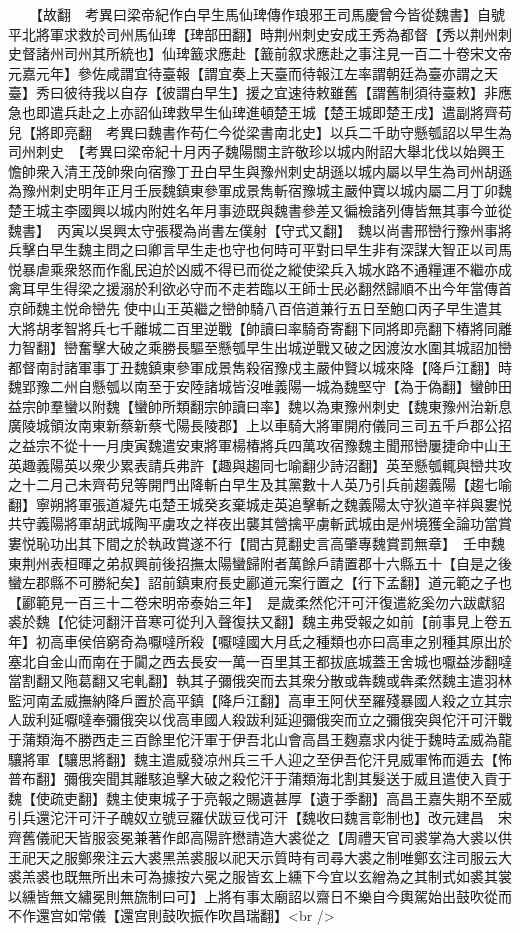 　　【故翻　考異曰梁帝紀作白早生馬仙琕傳作琅邪王司馬慶曾今皆從魏書】自號平北將軍求救於司州馬仙琕【琕部田翻】時荆州刺史安成王秀為都督【秀以荆州刺史督諸州司州其所統也】仙琕籖求應赴【籖前叙求應赴之事注見一百二十卷宋文帝元嘉元年】參佐咸謂宜待臺報【謂宜奏上天臺而待報江左率謂朝廷為臺亦謂之天臺】秀曰彼待我以自存【彼謂白早生】援之宜速待敕雖舊【謂舊制須待臺敕】非應急也即遣兵赴之上亦詔仙琕救早生仙琕進頓楚王城【楚王城即楚王戌】遣副將齊苟兒【將即亮翻　考異曰魏書作苟仁今從梁書南北史】以兵二千助守懸瓠詔以早生為司州刺史　【考異曰梁帝紀十月丙子魏陽關主許敬珍以城内附詔大舉北伐以始興王憺帥衆入清王茂帥衆向宿豫丁丑白早生與豫州刺史胡遜以城内屬以早生為司州胡遜為豫州刺史明年正月壬辰魏鎮東參軍成景雋斬宿豫城主嚴仲寶以城内屬二月丁卯魏楚王城主李國興以城内附姓名年月事迹既與魏書參差又徧檢諸列傳皆無其事今並從魏書】　丙寅以吳興太守張稷為尚書左僕射【守式又翻】　魏以尚書邢巒行豫州事將兵擊白早生魏主問之曰卿言早生走也守也何時可平對曰早生非有深謀大智正以司馬悦暴虐乘衆怒而作亂民迫於凶威不得已而從之縱使梁兵入城水路不通糧運不繼亦成禽耳早生得梁之援溺於利欲必守而不走若臨以王師士民必翻然歸順不出今年當傳首京師魏主悦命巒先使中山王英繼之巒帥騎八百倍道兼行五日至鮑口丙子早生遣其大將胡孝智將兵七千離城二百里逆戰【帥讀曰率騎奇寄翻下同將即亮翻下椿將同離力智翻】巒奮擊大破之乘勝長驅至懸瓠早生出城逆戰又破之因渡汝水圍其城詔加巒都督南討諸軍事丁丑魏鎮東參軍成景雋殺宿豫戍主嚴仲賢以城來降【降戶江翻】時魏郢豫二州自懸瓠以南至于安陸諸城皆沒唯義陽一城為魏堅守【為于偽翻】蠻帥田益宗帥羣蠻以附魏【蠻帥所類翻宗帥讀曰率】魏以為東豫州刺史【魏東豫州治新息廣陵城領汝南東新蔡新蔡弋陽長陵郡】上以車騎大將軍開府儀同三司五千戶郡公招之益宗不從十一月庚寅魏遣安東將軍楊椿將兵四萬攻宿豫魏主聞邢巒屢捷命中山王英趣義陽英以衆少累表請兵弗許【趣與趨同七喻翻少詩沼翻】英至懸瓠輒與巒共攻之十二月己未齊苟兒等開門出降斬白早生及其黨數十人英乃引兵前趨義陽【趨七喻翻】寧朔將軍張道凝先屯楚王城癸亥棄城走英追擊斬之魏義陽太守狄道辛祥與婁悦共守義陽將軍胡武城陶平虜攻之祥夜出襲其營擒平虜斬武城由是州境獲全論功當賞婁悦恥功出其下間之於執政賞遂不行【間古莧翻史言高肇專魏賞罰無章】　壬申魏東荆州表桓暉之弟叔興前後招撫太陽蠻歸附者萬餘戶請置郡十六縣五十【自是之後蠻左郡縣不可勝紀矣】詔前鎮東府長史酈道元案行置之【行下孟翻】道元範之子也【酈範見一百三十二卷宋明帝泰始三年】　是歲柔然佗汗可汗復遣紇奚勿六跋獻貂裘於魏【佗徒河翻汗音寒可從刋入聲復扶又翻】魏主弗受報之如前【前事見上卷五年】初高車侯倍窮奇為嚈噠所殺【嚈噠國大月氐之種類也亦曰高車之别種其原出於塞北自金山而南在于闐之西去長安一萬一百里其王都拔底城蓋王舍城也嚈益涉翻噠當割翻又陁葛翻又宅軋翻】執其子彌俄突而去其衆分散或犇魏或犇柔然魏主遣羽林監河南孟威撫納降戶置於高平鎮【降戶江翻】高車王阿伏至羅殘暴國人殺之立其宗人跋利延嚈噠奉彌俄突以伐高車國人殺跋利延迎彌俄突而立之彌俄突與佗汗可汗戰于蒲類海不勝西走三百餘里佗汗軍于伊吾北山會高昌王麴嘉求内徙于魏時孟威為龍驤將軍【驤思將翻】魏主遣威發凉州兵三千人迎之至伊吾佗汗見威軍怖而遁去【怖普布翻】彌俄突聞其離駭追擊大破之殺佗汗于蒲類海北割其髮送于威且遣使入貢于魏【使疏吏翻】魏主使東城子于亮報之賜遺甚厚【遺于季翻】高昌王嘉失期不至威引兵還沱汗可汗子醜奴立號豆羅伏跋豆伐可汗【魏收曰魏言彰制也】改元建昌　宋齊舊儀祀天皆服衮冕兼著作郎高陽許懋請造大裘從之【周禮天官司裘掌為大裘以供王祀天之服鄭衆注云大裘黑羔裘服以祀天示質時有司尋大裘之制唯鄭玄注司服云大裘羔裘也既無所出未可為據按六冕之服皆玄上纁下今宜以玄繒為之其制式如裘其裳以纁皆無文繡冕則無旒制曰可】上將有事太廟詔以齋日不樂自今輿駕始出鼓吹從而不作還宫如常儀【還宫則鼓吹振作吹昌瑞翻】<br />
